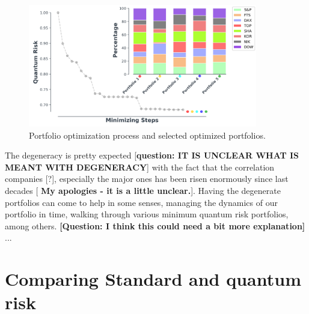 \documentclass[ aip,jmp,reprint]{revtex4-2}
\begin{document}
\begin{figure}[tbh]
\centering
\includegraphics[width=100mm]{fig6pr.png}
\caption{Portfolio optimization process and selected optimized portfolios.}
\label{fig:3}
\end{figure}
\newline
The degeneracy is pretty expected [\textbf{question: IT IS UNCLEAR WHAT IS
MEANT WITH DEGENERACY}] with the fact that the correlation companies [?],
especially the major ones has been risen enormously since last decades [%
\textbf{My apologies - it is a little unclear.}]. Having the degenerate
portfolios can come to help in some senses, managing the dynamics of our
portfolio in time, walking through various minimum quantum risk portfolios,
among others. \textbf{[Question: I think this could need a bit more
explanation]} ... \newpage 

\section{Comparing Standard and quantum risk}
\end{document}
